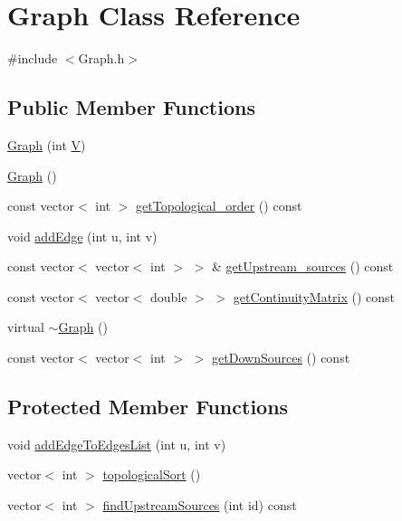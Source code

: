 \hypertarget{classGraph}{}\section{Graph Class Reference}
\label{classGraph}


{\ttfamily \#include $<$Graph.\+h$>$}

\subsection*{Public Member Functions}
\begin{DoxyCompactItemize}
\item 
\mbox{\hyperlink{classGraph_af3ff6b295df8bf3bee0bafd7c7d56915_af3ff6b295df8bf3bee0bafd7c7d56915}{Graph}} (int \mbox{\hyperlink{classGraph_a2b722f7cfa7a21e4cb5fae488b3d4dcc_a2b722f7cfa7a21e4cb5fae488b3d4dcc}{V}})
\item 
\mbox{\hyperlink{classGraph_ae4c72b8ac4d693c49800a4c7e273654f_ae4c72b8ac4d693c49800a4c7e273654f}{Graph}} ()
\item 
const vector$<$ int $>$ \mbox{\hyperlink{classGraph_a4d531e9313e31e92b9e816bdb5a9d14f_a4d531e9313e31e92b9e816bdb5a9d14f}{get\+Topological\+\_\+order}} () const
\item 
void \mbox{\hyperlink{classGraph_ad8c10df34357b2cd865c81e0c4f0bd8c_ad8c10df34357b2cd865c81e0c4f0bd8c}{add\+Edge}} (int u, int v)
\item 
const vector$<$ vector$<$ int $>$ $>$ \& \mbox{\hyperlink{classGraph_a0d4d0149e7d70bb9e6b7a5cae22062a3_a0d4d0149e7d70bb9e6b7a5cae22062a3}{get\+Upstream\+\_\+sources}} () const
\item 
const vector$<$ vector$<$ double $>$ $>$ \mbox{\hyperlink{classGraph_aa6e27da7010986d54cd2ec79dbbf4abe_aa6e27da7010986d54cd2ec79dbbf4abe}{get\+Continuity\+Matrix}} () const
\item 
virtual \mbox{\hyperlink{classGraph_a902c5b3eacb66d60752525ab23297a95_a902c5b3eacb66d60752525ab23297a95}{$\sim$\+Graph}} ()
\item 
const vector$<$ vector$<$ int $>$ $>$ \mbox{\hyperlink{classGraph_a9bbef60829d62f08e802dd1fbda0e4b7_a9bbef60829d62f08e802dd1fbda0e4b7}{get\+Down\+Sources}} () const
\end{DoxyCompactItemize}
\subsection*{Protected Member Functions}
\begin{DoxyCompactItemize}
\item 
void \mbox{\hyperlink{classGraph_a6f175234dc3c87150a53eab5c4e586ef_a6f175234dc3c87150a53eab5c4e586ef}{add\+Edge\+To\+Edges\+List}} (int u, int v)
\item 
vector$<$ int $>$ \mbox{\hyperlink{classGraph_a8f154c485f989828d6fb515a28190ac2_a8f154c485f989828d6fb515a28190ac2}{topological\+Sort}} ()
\item 
vector$<$ int $>$ \mbox{\hyperlink{classGraph_a17fc2fd799b56ac496aa57036f3696d7_a17fc2fd799b56ac496aa57036f3696d7}{find\+Upstream\+Sources}} (int id) const
\end{DoxyCompactItemize}
